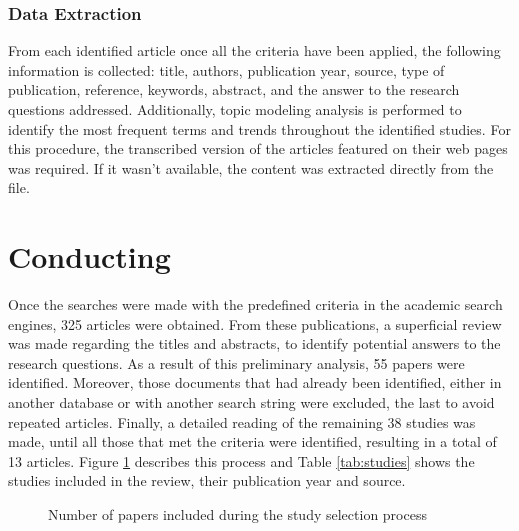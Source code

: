 \documentclass[conference]{IEEEtran}
\begin{document}
\subsubsection{Data Extraction}

From each identified article once all the criteria have been applied, the following information is collected: title, authors, publication year, source, type of publication, reference, keywords, abstract, and the answer to the research questions addressed.
Additionally, topic modeling analysis is performed to identify the most frequent terms and trends throughout the identified studies. For this procedure, the transcribed version of the articles featured on their web pages was required. If it wasn't available, the content was extracted directly from the file.

\section{Conducting}
\label{conducting}

Once the searches were made with the predefined criteria in the academic search engines, 325 articles were obtained. From these publications, a superficial review was made regarding the titles and abstracts, to identify potential answers to the research questions. As a result of this preliminary analysis, 55 papers were identified. Moreover, those documents that had already been identified, either in another database or with another search string were excluded, the last to avoid repeated articles. Finally, a detailed reading of the remaining 38 studies was made, until all those that met the criteria were identified, resulting in a total of 13 articles. Figure \ref{fig:rsl} describes this process and Table \ref{tab:studies} shows the studies included in the review, their publication year and source.

\begin{figure}[!htbp]
    \caption{\label{fig:rsl}Number of papers included during the study selection process}
\end{figure}
\end{document}
